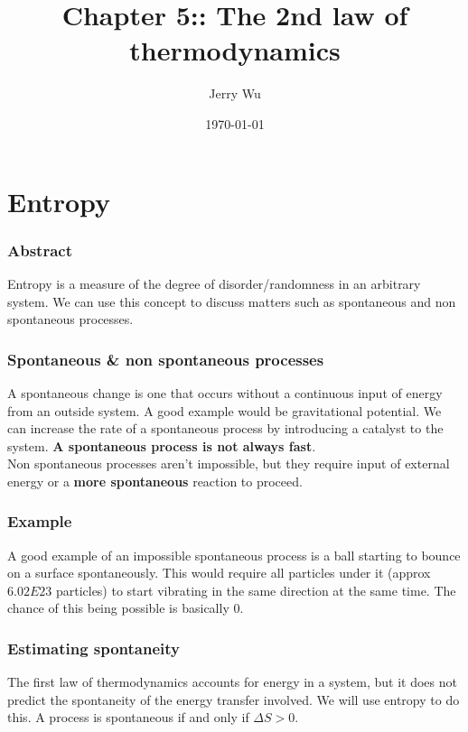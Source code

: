 \documentclass[12pt]{book}
\title{Chapter 5:: The 2nd law of thermodynamics}
\author{Jerry Wu}
\date{\today}
\begin{document}
\maketitle

\chapter*{Entropy}

\subsection*{Abstract}

Entropy is a measure of the degree of disorder/randomness in an arbitrary system. We can use this concept to discuss matters such as spontaneous and non spontaneous processes.

\subsection*{Spontaneous \& non spontaneous processes}

A spontaneous change is one that occurs without a continuous input of energy from an outside system. A good example would be gravitational potential. We can increase the rate of a spontaneous process by introducing a catalyst to the system. \textbf{A spontaneous process is not always fast}.\\Non spontaneous processes aren't impossible, but they require input of external energy or a \textbf{more spontaneous} reaction to proceed.

\subsection*{Example}

A good example of an impossible spontaneous process is a ball starting to bounce on a surface spontaneously. This would require all particles under it (approx $6.02E23$ particles) to start vibrating in the same direction at the same time. The chance of this being possible is basically 0.

\subsection*{Estimating spontaneity}

The first law of thermodynamics accounts for energy in a system, but it does not predict the spontaneity of the energy transfer involved. We will use entropy to do this. A process is spontaneous if and only if $\Delta S>0$.
\end{document}
